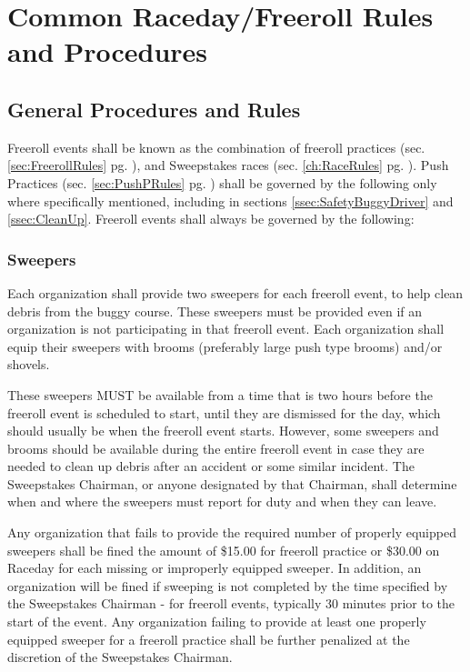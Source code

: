 \chapter{Common Raceday/Freeroll Rules and Procedures}
\label{ch:CommonRules}

\section{General Procedures and Rules}
	Freeroll events shall be known as the combination of freeroll practices (sec. \ref{sec:FreerollRules} pg. \pageref{sec:FreerollRules}), and Sweepstakes races (sec. \ref{ch:RaceRules} pg. \pageref{ch:RaceRules}). Push Practices (sec. \ref{sec:PushPRules} pg. \pageref{sec:PushPRules}) shall be governed by the following only where specifically mentioned, including in sections \ref{ssec:SafetyBuggyDriver} and \ref{ssec:CleanUp}. Freeroll events shall always be governed by the following:

\subsection{Sweepers}
\label{subsec:Sweepers}

	Each organization shall provide two sweepers for each freeroll event, to help clean debris from the buggy course. These sweepers must be provided even if an organization is not participating in that freeroll event. Each organization shall equip their sweepers with brooms (preferably large push type brooms) and/or shovels.

	These sweepers MUST be available from a time that is two hours before the freeroll event is scheduled to start, until they are dismissed for the day, which should usually be when the freeroll event starts. However, some sweepers and brooms should be available during the entire freeroll event in case they are needed to clean up debris after an accident or some similar incident. The Sweepstakes Chairman, or anyone designated by that Chairman, shall determine when and where the sweepers must report for duty and when they can leave.

	Any organization that fails to provide the required number of properly equipped sweepers shall be fined the amount of \$15.00 for freeroll practice or \$30.00 on Raceday for each missing or improperly equipped sweeper. In addition, an organization will be fined if sweeping is not completed by the time specified by the Sweepstakes Chairman - for freeroll events, typically 30 minutes prior to the start of the event. Any organization failing to provide at least one properly equipped sweeper for a freeroll practice shall be further penalized at the discretion of the Sweepstakes Chairman.

